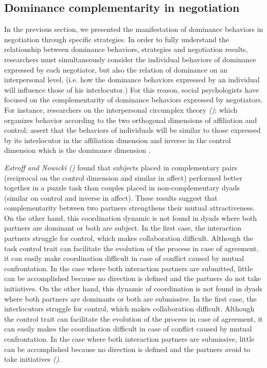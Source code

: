 \documentclass[10pt, a4paper, twocolumn]{article} %
\begin{document}
		\subsection{Dominance complementarity in negotiation}
			 In the previous section, we presented the manifestation of dominance behaviors in negotiation through specific strategies.
			 In order to fully understand the relationship between dominance behaviors, strategies and negotiation results, researchers must simultaneously consider the individual behaviors of dominance expressed by each negotiator, but also the relation of dominance on an interpersonal level, (i.e. how the dominance behaviors expressed by an individual will influence those of his interlocutor.)
				For this reason, social psychologists have focused on the complementarity of dominance behaviors expressed by negotiators. For instance, researchers on the interpersonal circumplex theory \emph{(\cites{wiggins1979psychological, kiesler19831982})}; which organizes behavior according to the two orthogonal dimensions of affiliation and control; assert that the behaviors of individuals will be similar to those expressed by its interlocutor in the affiliation dimension and inverse in the control dimension which is the dominance dimension \cite{tiedens2003power}.
				
				\emph{Estroff and Nowicki} \emph{(\cite{estroff1992interpersonal})} found that subjects placed in complementary pairs (reciprocal on the control dimension and similar in affect) performed better together in a puzzle task than couples placed in non-complementary dyads (similar on control and inverse in affect). These results suggest that complementarity between two partners strengthens their mutual attractiveness.
				On the other hand, this coordination dynamic is not found in dyads where both partners are dominant or both are subject. 
				In the first case, the interaction partners struggle for control, which makes collaboration difficult. Although the task control trait can facilitate the evolution of the process in case of agreement, it can easily make coordination difficult in case of conflict caused by mutual confrontation. In the case where both interaction partners are submitted, little can be accomplished because no direction is defined and the partners do not take initiatives.
				On the other hand, this dynamic of coordination  is not found in dyads where both partners are dominants or both are submissive. 
				In the first case, the interlocutors struggle for control, which makes collaboration difficult. Although the control trait can facilitate the evolution of the process in case of agreement, it can easily makes the coordination difficult in case of conflict caused by mutual confrontation. In the case where both interaction partners are submissive, little can be accomplished because no direction is defined and the partners avoid to take initiatives \emph{(\cite{wiltermuth2015benefits})}.
				
\end{document}
